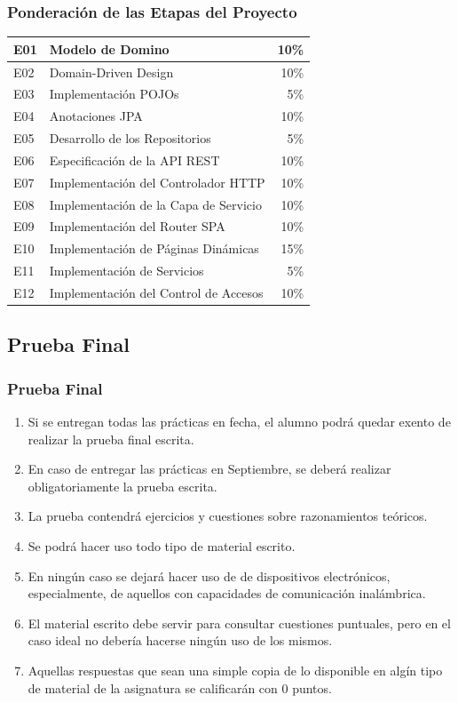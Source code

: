 \documentclass[a4paper,t,xcolor=pst,dvips,colortheme]{beamer}
\begin{document}
\begin{frame}[c]
    \frametitle{Ponderación de las Etapas del Proyecto}
    \begin{center}
	\begin{tabular}{|ll|r|}
    \hline \hline
	E01 & Modelo de Domino     & 10\% \\ \hline
    E02 & Domain-Driven Design & 10\% \\ \hline	
    E03 & Implementación POJOs &  5\% \\ \hline
    E04 & Anotaciones JPA                  & 10\% \\ \hline
    E05 & Desarrollo de los Repositorios   &  5\% \\ \hline
    E06 & Especificación de la API REST    & 10\% \\ \hline
    E07 & Implementación del Controlador HTTP   &   10\% \\ \hline
    E08 & Implementación de la Capa de Servicio &  10\% \\ \hline
    E09 & Implementación del Router SPA & 10\% \\ \hline
    E10 & Implementación de Páginas Dinámicas   & 15\% \\ \hline
    E11 & Implementación de Servicios           &  5\% \\ \hline
    E12 & Implementación del Control de Accesos & 10\% \\
    \hline \hline
	\end{tabular}
    \end{center}
\end{frame}

\subsection{Prueba Final}

\begin{frame}[c]
    \frametitle{Prueba Final}
	\begin{enumerate}[<+->]
        \item Si se entregan todas las prácticas en fecha, el alumno podrá quedar exento de realizar la  prueba final escrita.
        \item En caso de entregar las prácticas en Septiembre, se deberá realizar obligatoriamente la prueba escrita.
		\item La prueba contendrá ejercicios y cuestiones sobre razonamientos teóricos.
        \item Se podrá hacer uso todo tipo de material escrito.
        \item En ningún caso se dejará hacer uso de de dispositivos electrónicos, especialmente, de aquellos con capacidades de comunicación inalámbrica.
		\item \alert{El material escrito debe servir para consultar cuestiones puntuales, pero en el caso ideal no debería hacerse ningún uso de los mismos}.
		\item Aquellas respuestas que sean una simple copia de lo disponible en algín tipo de material de la asignatura se calificarán con 0 puntos.
	\end{enumerate}
\end{frame}
\end{document}
